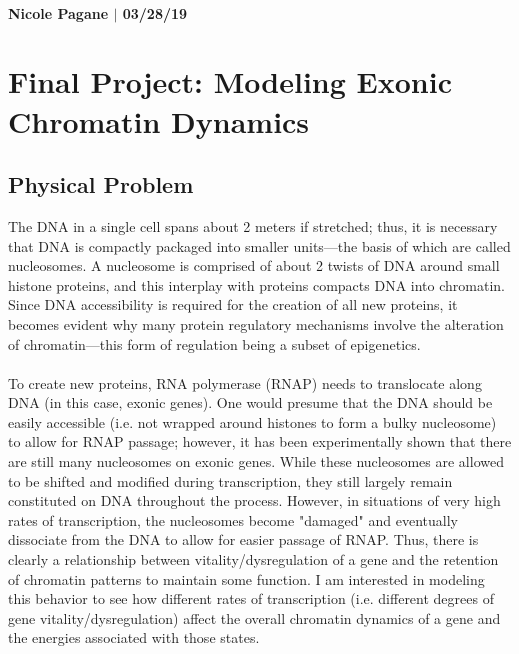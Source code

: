 \documentclass[12pt]{article}
\begin{document}
\paragraph{Nicole Pagane $|$ 03/28/19 }

\section*{Final Project: Modeling Exonic Chromatin Dynamics}

\subsection*{Physical Problem}
The DNA in a single cell spans about 2 meters if stretched; thus, it is necessary that DNA is compactly packaged into smaller units---the basis of which are called nucleosomes. A nucleosome is comprised of about 2 twists of DNA around small histone proteins, and this interplay with proteins compacts DNA into chromatin. Since DNA accessibility is required for the creation of all new proteins, it becomes evident why many protein regulatory mechanisms involve the alteration of chromatin---this form of regulation being a subset of epigenetics. \\ 
\\ 
To create new proteins, RNA polymerase (RNAP) needs to translocate along DNA (in this case, exonic genes). One would presume that the DNA should be easily accessible (i.e. not wrapped around histones to form a bulky nucleosome) to allow for RNAP passage; however, it has been experimentally shown that there are still many nucleosomes on exonic genes. While these nucleosomes are allowed to be shifted and modified during transcription, they still largely remain constituted on DNA throughout the process. However, in situations of very high rates of transcription, the nucleosomes become "damaged" and eventually dissociate from the DNA to allow for easier passage of RNAP. Thus, there is clearly a relationship between vitality/dysregulation of a gene and the retention of chromatin patterns to maintain some function. I am interested in modeling this behavior to see how different rates of transcription (i.e. different degrees of gene vitality/dysregulation) affect the overall chromatin dynamics of a gene and the energies associated with those states. 
\end{document}
